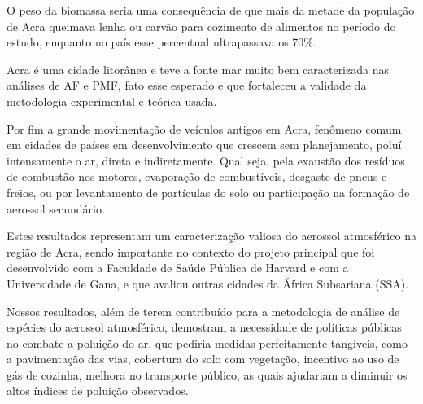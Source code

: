 O peso da biomassa seria uma consequência de que mais da metade da população de Acra queimava lenha ou carvão para cozimento de alimentos no período do estudo, enquanto no país esse percentual ultrapassava os 70\%.

Acra é uma cidade litorânea e teve a fonte mar muito bem caracterizada nas análises de AF e PMF, fato esse esperado e que fortaleceu a validade da metodologia experimental e teórica usada.

Por fim a grande movimentação de veículos antigos em Acra, fenômeno comum em cidades de países em desenvolvimento que crescem sem planejamento, poluí intensamente o ar, direta e indiretamente. Qual seja, pela exaustão dos resíduos de combustão nos motores, evaporação de combustíveis, desgaste de pneus e freios, ou por levantamento de partículas do solo ou participação na formação de aerossol secundário. 

Estes resultados representam um caracterização valiosa do aerossol atmosférico na região de Acra, sendo importante no contexto do projeto principal que foi desenvolvido com a Faculdade de Saúde Pública de Harvard e com a Universidade de Gana, e que avaliou outras cidades da África Subsariana (SSA). 

Nossos resultados, além de terem contribuído para a metodologia de análise de espécies do aerossol atmosférico, demostram a necessidade de políticas públicas no combate a poluição do ar, que pediria medidas perfeitamente tangíveis, como a pavimentação das vias, cobertura do solo com vegetação, incentivo ao uso de gás de cozinha, melhora no transporte público, as quais ajudariam a diminuir os altos índices de poluição observados.